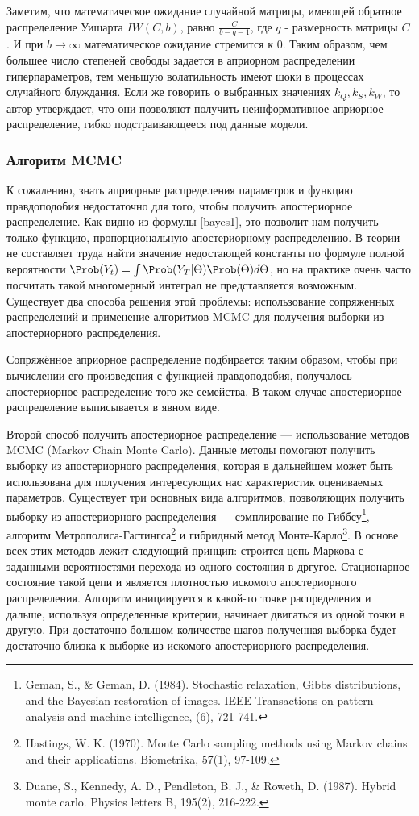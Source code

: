 Заметим, что математическое ожидание случайной матрицы, имеющей обратное распределение Уишарта $IW(C,b)$, равно $\frac{C}{b-q-1}$, где $q$ - размерность матрицы $C$. И при $b \rightarrow \infty$ математическое ожидание стремится к 0. Таким образом, чем большее число степеней свободы задается в априорном распределении гиперпараметров, тем меньшую волатильность имеют шоки в процессах случайного блуждания. Если же говорить о выбранных значениях $k_Q, k_S, k_W$, то автор утверждает, что они позволяют получить неинформативное априорное распределение, гибко подстраивающееся под данные модели.

\subsubsection{Алгоритм MCMC}
К сожалению, знать априорные распределения параметров и функцию правдоподобия недостаточно для того, чтобы получить апостериорное распределение. Как видно из формулы \eqref{bayes1}, это позволит нам получить только функцию, пропорциональную апостериорному распределению. В теории не составляет труда найти значение недостающей константы по формуле полной вероятности $\Prob(Y_t) = \int \Prob(Y_T|\Theta)\Prob(\Theta)d\Theta$, но на практике очень часто посчитать такой многомерный интеграл не представляется возможным. Существует два способа решения этой проблемы: использование сопряженных распределений и применение алгоритмов MCMC для получения выборки из апостериорного распределения.

Сопряжённое априорное распределение подбирается таким образом, чтобы при вычислении его произведения с функцией правдоподобия, получалось апостериорное распределение того же семейства. В таком случае апостериорное распределение выписывается в явном виде.

Второй способ получить апостериорное распределение --- использование методов MCMC (Markov Chain Monte Carlo). Данные методы помогают получить выборку из апостериорного распределения, которая в дальнейшем может быть использована для получения интересующих нас характеристик оцениваемых параметров. Существует три основных вида алгоритмов, позволяющих получить выборку из апостериорного распределения --- сэмплирование по Гиббсу\footnote{Geman, S., \& Geman, D. (1984). Stochastic relaxation, Gibbs distributions, and the Bayesian restoration of images. IEEE Transactions on pattern analysis and machine intelligence, (6), 721-741.}, алгоритм Метрополиса-Гастингса\footnote{Hastings, W. K. (1970). Monte Carlo sampling methods using Markov chains and their applications. Biometrika, 57(1), 97-109.} и гибридный метод Монте-Карло\footnote{Duane, S., Kennedy, A. D., Pendleton, B. J., \& Roweth, D. (1987). Hybrid monte carlo. Physics letters B, 195(2), 216-222.}. В основе всех этих методов лежит следующий принцип: строится цепь Маркова с заданными вероятностями перехода из одного состояния в дргугое. Стационарное состояние такой цепи и является плотностью искомого апостериорного распределения. Алгоритм инициируется в какой-то точке распределения и дальше, используя определенные критерии, начинает двигаться из одной точки в другую. При достаточно большом количестве шагов полученная выборка будет достаточно близка к выборке из искомого апостериорного распределения.

